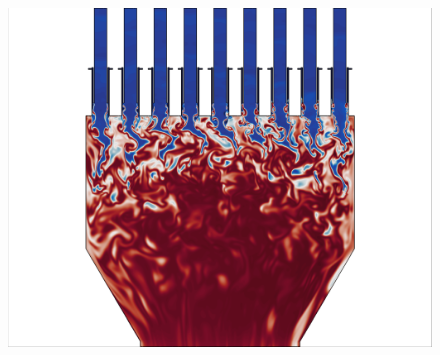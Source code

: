 \begin{figure}
{\begin{minipage}{0.32\linewidth}
		\includegraphics[width=0.99\linewidth,trim={0.5em 0.5em 15.0em 0.5em},clip]{Chapters/HPROMResults/Images/nineElem/unsampled/rom_k75_temp_z.png}
	\end{minipage}
	}


\end{figure}

